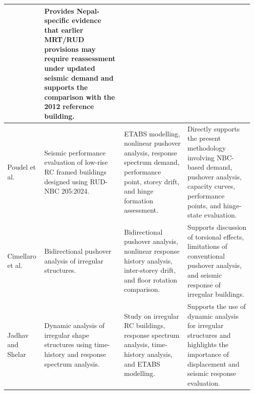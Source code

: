 \begin{longtable}{@{}p{3.35cm}p{2.95cm}p{3.35cm}p{3.25cm}@{}}
& Provides Nepal-specific evidence that earlier MRT/RUD provisions may require reassessment under updated seismic demand and supports the comparison with the 2012 reference building. \\ \hline
Poudel et al.\newline \cite{poudel2025seismic}
& Seismic performance evaluation of low-rise RC framed buildings designed using RUD-NBC 205:2024.
& ETABS modelling, nonlinear pushover analysis, response spectrum demand, performance point, storey drift, and hinge formation assessment.
& Directly supports the present methodology involving NBC-based demand, pushover analysis, capacity curves, performance points, and hinge-state evaluation. \\ \hline
Cimellaro et al.\newline \cite{cimellaro2014bidirectional}
& Bidirectional pushover analysis of irregular structures.
& Bidirectional pushover analysis, nonlinear response history analysis, inter-storey drift, and floor rotation comparison.
& Supports discussion of torsional effects, limitations of conventional pushover analysis, and seismic response of irregular buildings. \\ \hline
Jadhav and Shelar\newline \cite{jadhav2025study}
& Dynamic analysis of irregular shape structures using time-history and response spectrum analysis.
& Study on irregular RC buildings, response spectrum analysis, time-history analysis, and ETABS modelling.
& Supports the use of dynamic analysis for irregular structures and highlights the importance of displacement and seismic response evaluation. \\ \hline\hline
\end{longtable}
\endgroup
\begingroup
\footnotesize
\renewcommand{\arraystretch}{1.08}
\setlength{\tabcolsep}{3pt}
\setlength{\LTpre}{6pt}
\setlength{\LTpost}{6pt}

